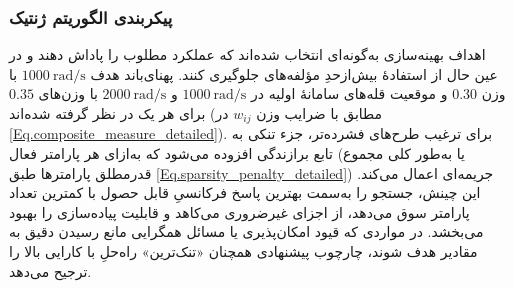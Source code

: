 \subsubsection{پیکربندی الگوریتم ژنتیک}

اهداف بهینه‌سازی به‌گونه‌ای انتخاب شده‌اند که عملکرد مطلوب را پاداش دهند و در عین حال از استفادهٔ بیش‌ازحدِ مؤلفه‌های  جلوگیری کنند. پهنای‌باند هدف $1000~\text{rad/s}$ با وزن $0.30$ و موقعیت قله‌های سامانهٔ اولیه در $1000~\text{rad/s}$ و $2000~\text{rad/s}$ با وزن‌های $0.35$ برای هر یک در نظر گرفته شده‌اند (مطابق با ضرایب وزن $w_{ij}$ در \eqref{Eq.composite_measure_detailed}). برای ترغیب طرح‌های فشرده‌تر، جزء تنکی به تابع برازندگی افزوده می‌شود که به‌ازای هر پارامتر فعال  (یا به‌طور کلی مجموع قدرمطلق پارامترها طبق \eqref{Eq.sparsity_penalty_detailed}) جریمه‌ای اعمال می‌کند. این چینش، جستجو را به‌سمت بهترین پاسخ فرکانسیِ قابل حصول با کمترین تعداد پارامتر سوق می‌دهد، از اجزای غیرضروری می‌کاهد و قابلیت پیاده‌سازی را بهبود می‌بخشد. در مواردی که قیود امکان‌پذیری یا مسائل همگرایی مانع رسیدن دقیق به مقادیر هدف شوند، چارچوب پیشنهادی همچنان «تنک‌ترین» راه‌حلِ با کارایی بالا را ترجیح می‌دهد.









